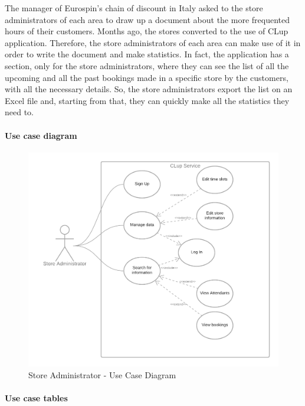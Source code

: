 \documentclass[table, 12pt]{article}
\begin{document}
The manager of Eurospin's chain of discount in Italy asked to the store administrators of each area to draw up a document about the more frequented hours of their customers. Months ago, the stores converted to the use of CLup application. Therefore, the store administrators of each area can make use of it in order to write the document and make statistics. In fact, the application has a section, only for the store administrators, where they can see the list of all the upcoming and all the past bookings made in a specific store by the customers, with all the necessary details. So, the store administrators export the list on an Excel file and, starting from that, they can quickly make all the statistics they need to.


\paragraph{Use case diagram}
\begin{figure}[H]
    \begin{center}
        \includegraphics[width=\textwidth]{assets/use_case_diagram_store_manager.png}
        \caption{Store Administrator - Use Case Diagram}
    \end{center}
\end{figure}

\newpage
\paragraph{Use case tables}
\end{document}
